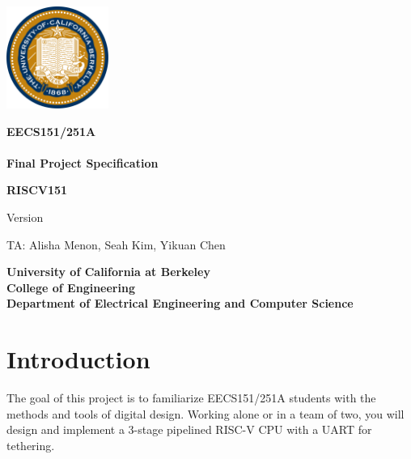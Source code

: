 \documentclass[11pt]{article}
\begin{document}
\clearpage
\thispagestyle{empty}

\begin{center}
\includegraphics[width=0.25\textwidth]{images/Seal_of_University_of_California_Berkeley.png}
\end{center}
\begin{center}
\LARGE{
\color{gray}
\bf EECS151/251A \\
\currentSemester\\
Final Project Specification\\
}
\end{center}

\vfill


\begin{center}
\color{berkeleyblue}
\Huge
{\bf RISCV151 }  \\
\end{center}

\vfill

\begin{center}
\LARGE{
\color{gray}
Version \projectSpecVersion\\}
\end{center}

\vspace{3mm}

\begin{center}
\large{
TA: Alisha Menon, Seah Kim, Yikuan Chen}
\end{center}

\begin{center}
\large{
\bf
University of California at Berkeley \\
College of Engineering \\
Department of Electrical Engineering and Computer Science \\
}
\end{center}

\newpage
{}
\tableofcontents

\newpage

\section{Introduction}
The goal of this project is to familiarize EECS151/251A students with the methods and tools of digital design.
Working alone or in a team of two, you will design and implement a 3-stage pipelined RISC-V CPU with a UART for tethering.
\end{document}
